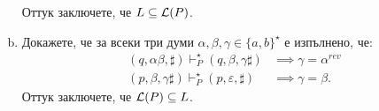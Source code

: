 \begin{example}
\begin{enumerate}[a)]
    Оттук заключете, че $L \subseteq \mathcal{L}(P)$.
  \item
    Докажете, че за всеки три думи $\alpha,\beta, \gamma \in \{a,b\}^\star$ е изпълнено, че:
    \begin{align*}
      (q, \alpha\beta, \sharp) \vdash^\star_P (q, \beta, \gamma\sharp)  & \implies \gamma = \alpha^{rev}\\
      (p, \beta, \gamma\sharp) \vdash^\star_P (p, \varepsilon, \sharp) & \implies \gamma = \beta.
    \end{align*}
    Оттук заключете, че $\mathcal{L}(P) \subseteq L$.
  \end{enumerate}

\end{example}



